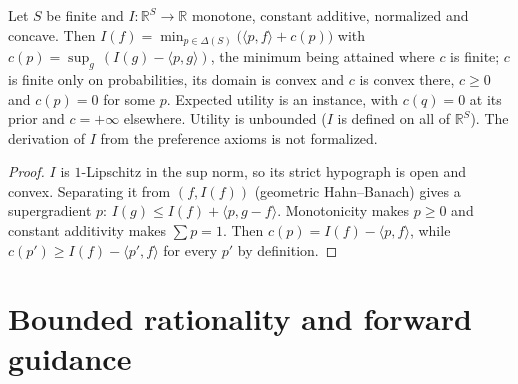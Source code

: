 \begin{theorem}
\label{thm:beh-variational}
\leanok
Let $S$ be finite and $I:\mathbb R^S\to\mathbb R$ monotone, constant additive, normalized and concave. Then
$I(f)=\min_{p\in\Delta(S)}\big(\langle p,f\rangle+c(p)\big)$ with $c(p)=\sup_g\,(I(g)-\langle p,g\rangle)$, the minimum
being attained where $c$ is finite; $c$ is finite only on probabilities, its domain is convex and $c$ is convex there,
$c\ge0$ and $c(p)=0$ for some $p$. Expected utility is an instance, with $c(q)=0$ at its prior and $c=+\infty$
elsewhere. Utility is unbounded ($I$ is defined on all of $\mathbb R^S$). The derivation of $I$ from the preference axioms is not formalized.
\end{theorem}
\begin{proof}
\leanok
$I$ is $1$-Lipschitz in the sup norm, so its strict hypograph is open and convex. Separating it from
$(f,I(f))$ (geometric Hahn--Banach) gives a supergradient $p$: $I(g)\le I(f)+\langle p,g-f\rangle$. Monotonicity
makes $p\ge0$ and constant additivity makes $\sum p=1$. Then $c(p)=I(f)-\langle p,f\rangle$, while
$c(p')\ge I(f)-\langle p',f\rangle$ for every $p'$ by definition.
\end{proof}

\section{Bounded rationality and forward guidance}

